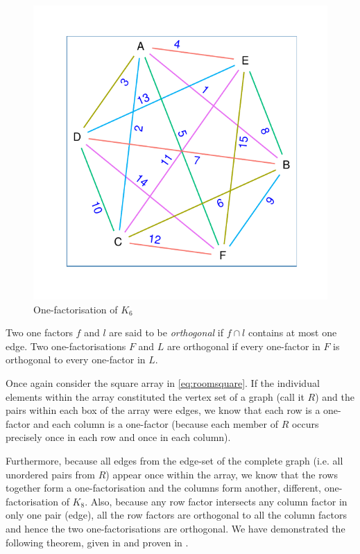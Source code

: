 \documentclass[11pt, a4paper]{book}\usepackage[]{graphicx}\usepackage[]{xcolor}
\makeatletter
\def\maxwidth{ %
  \ifdim\Gin@nat@width>\linewidth
    \linewidth
  \else
    \Gin@nat@width
  \fi
}
\newenvironment{knitrout}{}{} %
\makeatother
\begin{document}
\begin{knitrout}
\color{fgcolor}\begin{figure}

{\centering \includegraphics[width=\maxwidth]{figure/one-factorisation-1} 

}

\caption[One-factorisation of $K_6$]{One-factorisation of $K_6$}\label{fig:one-factorisation}
\end{figure}

\end{knitrout}

Two one factors $f$ and $l$ are said to be
\emph{orthogonal}
if $f \cap l$ contains at most one edge. Two one-factorisations
$F$ and $L$ are orthogonal if every one-factor in $F$ is
orthogonal to every one-factor in $L$.

Once again consider the square array in
\eqref{eq:roomsquare}.
If the individual elements within the array constituted the
vertex set of a graph (call it $R$) and the pairs within
each box of the array were edges, we know that each row is a
one-factor and each column is a one-factor (because each
member of $R$ occurs precisely once in each row and once in
each column).

Furthermore, because all edges from the
edge-set of the complete graph (i.e. all unordered pairs
from $R$) appear once within the array, we know that the
rows together form a one-factorisation and the columns form
another, different, one-factorisation of $K_8$. Also,
because any row factor intersects any column factor in only
one pair (edge), all the row factors are orthogonal to all
the column factors and hence the two one-factorisations are
orthogonal. We have demonstrated the following theorem,
given in
\cite{dinitzContemporaryDesignTheory1992}
and proven in
\cite{nemethStudyRoomSquares1969}.
\end{document}
